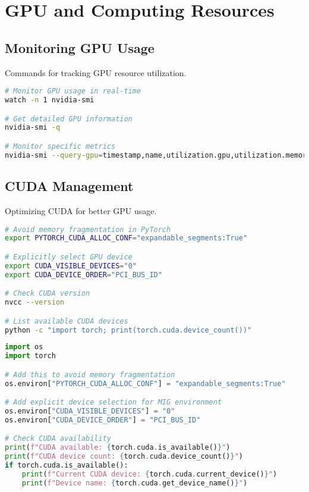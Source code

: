 \documentclass{article}
\begin{document}
\section{GPU and Computing Resources}

\subsection{Monitoring GPU Usage}
Commands for tracking GPU resource utilization.

\begin{tcolorbox}[colback=orange!5!white, colframe=orange!75!black, title=GPU Monitoring]
\begin{lstlisting}[language=bash]
# Monitor GPU usage in real-time
watch -n 1 nvidia-smi

# Get detailed GPU information
nvidia-smi -q

# Monitor specific metrics
nvidia-smi --query-gpu=timestamp,name,utilization.gpu,utilization.memory,memory.used,memory.total --format=csv -l 1
\end{lstlisting}
\end{tcolorbox}

\subsection{CUDA Management}
Optimizing CUDA for better GPU usage.

\begin{tcolorbox}[colback=orange!5!white, colframe=orange!75!black, title=CUDA Environment Setup]
\begin{lstlisting}[language=bash]
# Avoid memory fragmentation in PyTorch
export PYTORCH_CUDA_ALLOC_CONF="expandable_segments:True"

# Explicitly select GPU device
export CUDA_VISIBLE_DEVICES="0"
export CUDA_DEVICE_ORDER="PCI_BUS_ID"

# Check CUDA version
nvcc --version

# List available CUDA devices
python -c "import torch; print(torch.cuda.device_count())"
\end{lstlisting}
\end{tcolorbox}

\begin{tcolorbox}[colback=orange!5!white, colframe=orange!75!black, title=PyTorch CUDA Configuration Code]
\begin{lstlisting}[language=python]
import os
import torch

# Add this to avoid memory fragmentation
os.environ["PYTORCH_CUDA_ALLOC_CONF"] = "expandable_segments:True"

# Add explicit device selection for MIG environment
os.environ["CUDA_VISIBLE_DEVICES"] = "0"
os.environ["CUDA_DEVICE_ORDER"] = "PCI_BUS_ID"

# Check CUDA availability
print(f"CUDA available: {torch.cuda.is_available()}")
print(f"CUDA device count: {torch.cuda.device_count()}")
if torch.cuda.is_available():
    print(f"Current CUDA device: {torch.cuda.current_device()}")
    print(f"Device name: {torch.cuda.get_device_name()}")
\end{lstlisting}
\end{tcolorbox}
\end{document}
